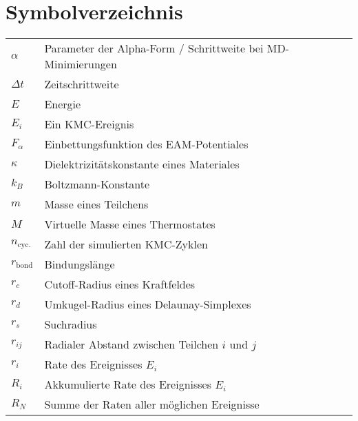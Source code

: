 \chapter*{Symbolverzeichnis}
\def\listacronymname{Symbolverzeichnis}

\begin{tabular}{ll}
$\alpha$         & Parameter der Alpha-Form / Schrittweite bei MD-Minimierungen \\
$\Delta t$       & Zeitschrittweite                                             \\
$E$              & Energie                                                      \\
$E_i$            & Ein KMC-Ereignis                                             \\
$F_\alpha$       & Einbettungsfunktion des EAM-Potentiales                      \\
$\kappa$         & Dielektrizitätskonstante eines Materiales                    \\
$k_B$            & Boltzmann-Konstante                                          \\
$m$              & Masse eines Teilchens                                        \\
$M$              & Virtuelle Masse eines Thermostates                           \\
$n_\text{cyc.}$  & Zahl der simulierten KMC-Zyklen                              \\
$r_\text{bond}$  & Bindungslänge                                                \\
$r_c$            & Cutoff-Radius eines Kraftfeldes                              \\
$r_d$            & Umkugel-Radius eines Delaunay-Simplexes                      \\
$r_s$            & Suchradius                                                   \\
$r_{ij}$         & Radialer Abstand zwischen Teilchen $i$ und $j$               \\
$r_i$            & Rate des Ereignisses $E_i$                                   \\
$R_i$            & Akkumulierte Rate des Ereignisses $E_i$                      \\
$R_N$            & Summe der Raten aller möglichen Ereignisse                   \\

\end{tabular}
